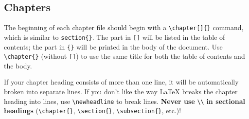 \subsection{Chapters} %

The beginning of each chapter file should begin with a \verb+\chapter[]{}+
%
command, which is similar to \verb"section{}".
The part in \verb"[]" will be listed in the table of contents; the part in \verb"{}" will be printed in the body of the document.
Use \verb+\chapter{}+ (without \verb"[]") to use the same title for both the table of contents and the body.

If your chapter heading consists of more than one line, it will be automatically broken into separate lines.
If you don't like the way LaTeX breaks the chapter heading into lines, use \verb+\newheadline+ to break lines.
\textbf{Never use} \verb+\\+ \textbf{in sectional headings} (\verb+\chapter{}+, \verb+\section{}+, \verb+\subsection{}+, etc.)!
%
%
%

